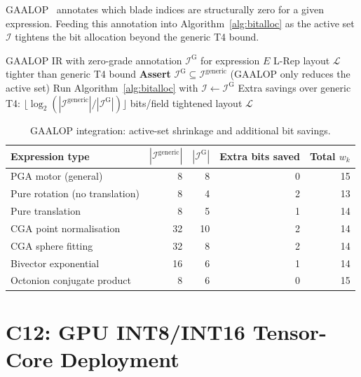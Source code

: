 \documentclass[11pt,a4paper]{article}
\theoremstyle{definition}
\theoremstyle{plain}
\theoremstyle{remark}
\begin{document}
GAALOP~\cite{gaalop} annotates which blade indices are structurally zero
for a given expression.
Feeding this annotation into Algorithm~\ref{alg:bitalloc} as the active
set $\mathcal{I}$ tightens the bit allocation beyond the generic T4 bound.

\begin{algorithm}[H]
\caption{GAALOP $\to$ L-Rep Compiler Pipeline}
\label{alg:gaalop}
\begin{algorithmic}[1]
\REQUIRE GAALOP IR with zero-grade annotation $\mathcal{I}^{\mathrm{G}}$ for expression $E$
\ENSURE L-Rep layout $\mathcal{L}$ tighter than generic T4 bound
\STATE \textbf{Assert} $\mathcal{I}^{\mathrm{G}}\subseteq\mathcal{I}^{\mathrm{generic}}$
       (GAALOP only reduces the active set)
\STATE Run Algorithm~\ref{alg:bitalloc} with $\mathcal{I}\leftarrow\mathcal{I}^{\mathrm{G}}$
\STATE Extra savings over generic T4: $\lfloor\log_2(|\mathcal{I}^{\mathrm{generic}}|/|\mathcal{I}^{\mathrm{G}}|)\rfloor$ bits/field
\RETURN tightened layout $\mathcal{L}$
\end{algorithmic}
\end{algorithm}

\begin{table}[h]
\centering
\caption{GAALOP integration: active-set shrinkage and additional bit savings.}
\label{tab:gaalop}
\begin{tabular}{lrrrr}
\toprule
Expression type & $|\mathcal{I}^{\mathrm{generic}}|$ & $|\mathcal{I}^{\mathrm{G}}|$ & Extra bits saved & Total $w_k$ \\
\midrule
PGA motor (general) & 8 & 8 & 0 & 15 \\
Pure rotation (no translation) & 8 & 4 & 2 & 13 \\
Pure translation & 8 & 5 & 1 & 14 \\
CGA point normalisation & 32 & 10 & 2 & 14 \\
CGA sphere fitting & 32 & 8 & 2 & 14 \\
Bivector exponential & 16 & 6 & 1 & 14 \\
Octonion conjugate product & 8 & 6 & 0 & 15 \\
\bottomrule
\end{tabular}
\end{table}

\section{C12: GPU INT8/INT16 Tensor-Core Deployment}
\label{sec:gpu}
\end{document}
